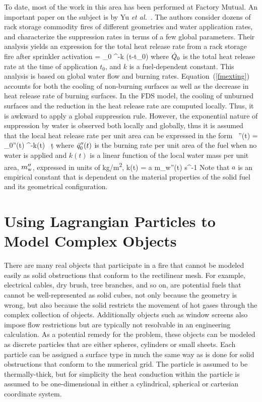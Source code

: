 To date, most of the work in this area has been performed at Factory Mutual. An important paper on the subject is by Yu {\em et al.}~\cite{Yu:1}. The authors consider dozens of rack storage commodity fires of different geometries and water application rates, and characterize the suppression rates in terms of a few global parameters. Their analysis yields an expression for the total heat release rate from a rack storage fire after sprinkler activation
\be
   \dQ = \dQ_0 \; ^{-k (t-t_0)}  \label{fmexting}
\ee
where $\dot{Q}_0$ is the total heat release rate at the time of application $t_0$, and $k$ is a fuel-dependent constant. This analysis is based on global water flow and burning rates. Equation~(\ref{fmexting}) accounts for both the cooling of non-burning surfaces as well as the decrease in heat release rate of burning surfaces. In the FDS model, the cooling of unburned surfaces and the reduction in the heat release rate are computed locally. Thus, it is awkward to apply a global suppression rule. However, the exponential nature of suppression by water is observed both locally and globally, thus it is assumed that the local heat release rate per unit area can be expressed in the form~\cite{Hamins:1,Hamins:IAFSS2002}
\be
   \dq''(t) = \dq_0''(t) \; ^{-\int k(t) \, \d t}
\label{nistexting} \ee
where $\dot{q}_0''(t)$ is the burning rate per unit area of the fuel when no water is applied and $k(t)$ is a linear function of the local water mass per unit area, $m_{\rm w}''$, expressed in units of \si{kg/m^2},
\be
   k(t) = a \; m_{\rm w}''(t) \quad   \hbox{s}^{-1}
\ee
Note that $a$ is an empirical constant that is dependent on the material properties of the solid fuel and its geometrical configuration.



\section{Using Lagrangian Particles to Model Complex Objects}
\label{rad_part_absorb}

There are many real objects that participate in a fire that cannot be modeled easily as solid obstructions that conform to the rectilinear mesh. For example, electrical cables, dry brush, tree branches, and so on, are potential fuels that cannot be well-represented as solid cubes, not only because the geometry is wrong, but also because the solid restricts the movement of hot gases through the complex collection of objects.  Additionally objects such as window screens also impose flow restrictions but are typically not resolvable in an engineering calculation. As a potential remedy for the problem, these objects can be modeled as discrete particles that are either spheres, cylinders or small sheets. Each particle can be assigned a surface type in much the same way as is done for solid obstructions that conform to the numerical grid. The particle is assumed to be thermally-thick, but for simplicity the heat conduction within the particle is assumed to be one-dimensional in either a cylindrical, spherical or cartesian coordinate system.

